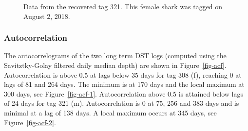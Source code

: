 \documentclass[
  authoryear,
  review,
  3p]{elsarticle}
\begin{document}
\begin{figure}

\begin{minipage}[t]{\linewidth}

{\centering 


}

\end{minipage}%
\newline
\begin{minipage}[t]{0.50\linewidth}

{\centering 


}

\end{minipage}%
%
\begin{minipage}[t]{0.50\linewidth}

{\centering 


}

\end{minipage}%

\caption{\label{fig-dst321}Data from the recovered tag 321. This female
shark was tagged on August 2, 2018.}

\end{figure}

\hypertarget{sec-resacf}{%
\subsubsection{Autocorrelation}\label{sec-resacf}}

The autocorrelograms of the two long term DST logs (computed using the
Savitztky-Golay filtered daily median depth) are shown in
Figure~\ref{fig-acf}. Autocorrelation is above 0.5 at lags below 35 days
for tag 308 (f), reaching 0 at lags of 81 and 264 days. The minimum is
at 170 days and the local maximum at 300 days, see
Figure~\ref{fig-acf-1}. Autocorrelation above 0.5 is attained below lags
of 24 days for tag 321 (m). Autocorrelation is 0 at 75, 256 and 383 days
and is minimal at a lag of 138 days. A local maximum occurs at 345 days,
see Figure~\ref{fig-acf-2}.
\end{document}
